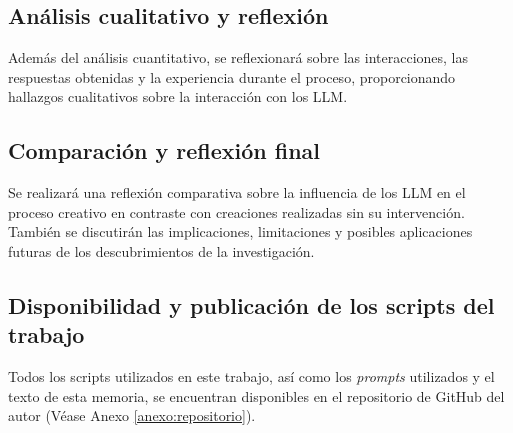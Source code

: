 \subsection{Análisis cualitativo y reflexión}
Además del análisis cuantitativo, se reflexionará sobre las interacciones, las respuestas obtenidas y la experiencia durante el proceso, proporcionando hallazgos cualitativos sobre la interacción con los LLM.

\subsection{Comparación y reflexión final}
Se realizará una reflexión comparativa sobre la influencia de los LLM en el proceso creativo en contraste con creaciones realizadas sin su intervención. También se discutirán las implicaciones, limitaciones y posibles aplicaciones futuras de los descubrimientos de la investigación.

\subsection{Disponibilidad y publicación de los scripts del trabajo}
Todos los scripts utilizados en este trabajo, así como los \textit{prompts} utilizados y el texto de esta memoria, se encuentran disponibles en el repositorio de GitHub del autor (Véase Anexo \ref{anexo:repositorio}).